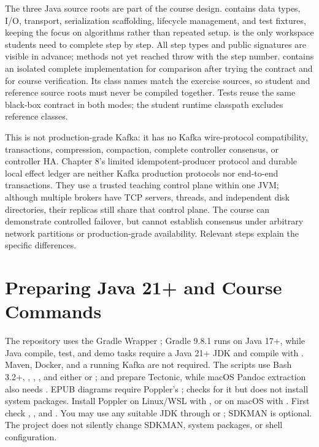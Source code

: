 The three Java source roots are part of the course design.  contains data types, I/O, transport, serialization scaffolding, lifecycle management, and test fixtures, keeping the focus on algorithms rather than repeated setup.  is the only workspace students need to complete step by step. All step types and public signatures are visible in advance; methods not yet reached throw  with the step number.  contains an isolated complete implementation for comparison after trying the contract and for course verification. Its class names match the exercise sources, so student and reference source roots must never be compiled together. Tests reuse the same black-box contract in both modes; the student runtime classpath excludes reference classes.

This is not production-grade Kafka: it has no Kafka wire-protocol compatibility, transactions, compression, compaction, complete controller consensus, or controller HA. Chapter 8's limited idempotent-producer protocol and durable local effect ledger are neither Kafka production protocols nor end-to-end transactions. They use a trusted teaching control plane within one JVM; although multiple brokers have TCP servers, threads, and independent disk directories, their replicas still share that control plane. The course can demonstrate controlled failover, but cannot establish consensus under arbitrary network partitions or production-grade availability. Relevant steps explain the specific differences.

\section{Preparing Java 21+ and Course Commands}
The repository uses the Gradle Wrapper ; Gradle 9.8.1 runs on Java 17+, while Java compile, test, and demo tasks require a Java 21+ JDK and compile with . Maven, Docker, and a running Kafka are not required. The scripts use Bash 3.2+, , , , and either  or ;  and  prepare Tectonic, while macOS Pandoc extraction also needs . EPUB diagrams require Poppler's ;  checks for it but does not install system packages. Install Poppler on Linux/WSL with , or on macOS with . First check , , and . You may use any suitable JDK through  or ; SDKMAN is optional. The project does not silently change SDKMAN, system packages, or shell configuration.

